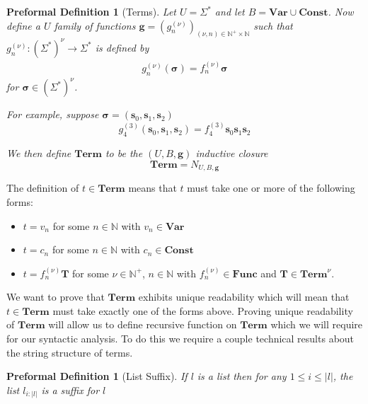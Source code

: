 \documentclass[oneside, 12pt]{book}
\theoremstyle{break}
\newtheorem{preformal definition}[definition]{Preformal Definition}
\newtheorem{preformal theorem}[theorem]{Preformal Theorem}
\newcommand{\bv}[1]{\boldsymbol{#1}}
\newcommand{\N}[0]{\mathbb{N}}
\newcommand{\norm}[1]{\left|#1\right|}
\begin{document}
		\begin{preformal definition}[Terms]
			Let $U=\Sigma^*$ and let $B = \textbf{Var} \cup \textbf{Const}$.
			Now define a $U$ family of functions $\bv{g} = (g_n^{(\nu)})_{(\nu, n) \in \N^+ \times \N}$ such that $g_n^{(\nu)}: (\Sigma^*)^{\nu} \to \Sigma^*$ is defined by
			\begin{align*}
				g_n^{(\nu)}(\bv{\sigma}) = f_n^{(\nu)}\bv{\sigma}
			\end{align*}
			for $\bv{\sigma} \in (\Sigma^*)^\nu$.
			
			For example, suppose $\bv{\sigma} = (\bv{s}_0, \bv{s}_1, \bv{s}_2)$ 
			\begin{equation*}
				g_4^{(3)}(\bv{s}_0, \bv{s}_1, \bv{s}_2) = f_4^{(3)}\bv{s}_0\bv{s}_1\bv{s}_2
			\end{equation*}
			
			We then define $\textbf{Term}$ to be the $(U, B, \bv{g})$ inductive closure
			\begin{equation*}
				\textbf{Term} = N_{U, B, \bv{g}}
			\end{equation*}			
		\end{preformal definition}
	
		The definition of $t\in \textbf{Term}$ means that $t$ must take one or more of the following forms:
		\begin{itemize}
			\item{$t=v_n$ for some $n\in \N$ with $v_n \in \textbf{Var}$}
			\item{$t=c_n$ for some $n\in \N$ with $c_n \in \textbf{Const}$}
			\item{$t=f_n^{(\nu)}\bv{T}$ for some $\nu \in \N^+$, $n\in \N$ with $f_n^{(\nu)} \in \textbf{Func}$ and $\bv{T} \in \textbf{Term}^\nu$.}
		\end{itemize}
		
		We want to prove that $\textbf{Term}$ exhibits unique readability which will mean that $t\in \textbf{Term}$ must take exactly one of the forms above.
		Proving unique readability of $\textbf{Term}$ will allow us to define recursive function on $\textbf{Term}$ which we will require for our syntactic analysis.
		To do this we require a couple technical results about the string structure of terms.
		
		\begin{preformal definition}[List Suffix]
			If $l$ is a list then for any $1\le i \le \norm{l}$, the list $l_{i:\norm{l}}$ is a suffix for $l$
		\end{preformal definition}
		
\end{document}
